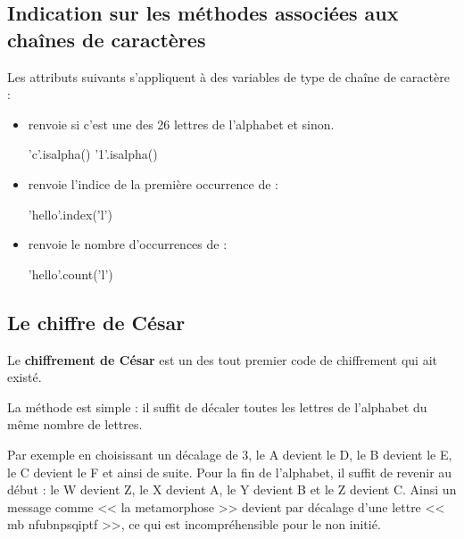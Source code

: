 

\setcounter{section}{1}

\subsection{Indication sur les méthodes associées aux chaînes de caractères}

Les attributs suivants s'appliquent à des variables de type de chaîne de caractère :
\begin{itemize}
\item {} renvoie  si c'est une des 26 lettres de l'alphabet et  sinon.
\begin{pyconsole}
'c'.isalpha()
'1'.isalpha()
\end{pyconsole}
\item {} renvoie l'indice de la première occurrence de  :
\begin{pyconsole}
'hello'.index('l')
\end{pyconsole}
\item {} renvoie le nombre d'occurrences de  :
\begin{pyconsole}
'hello'.count('l')
\end{pyconsole}
\end{itemize}

\subsection{Le chiffre de César}



Le \textbf{chiffrement de César} est un des tout premier code de chiffrement qui ait existé. 

La méthode est simple : il suffit de décaler toutes les lettres de l'alphabet du même nombre de lettres. 



Par exemple en choisissant un décalage de 3, le A devient le D, le B devient le E, le C devient le F et ainsi de suite. Pour la fin de l'alphabet, il suffit de revenir au début : le W devient Z, le X devient A, le Y devient B et le Z devient C. Ainsi un message comme << la metamorphose >> devient par décalage d'une lettre << mb nfubnpsqiptf >>, ce qui est incompréhensible pour le non initié.





